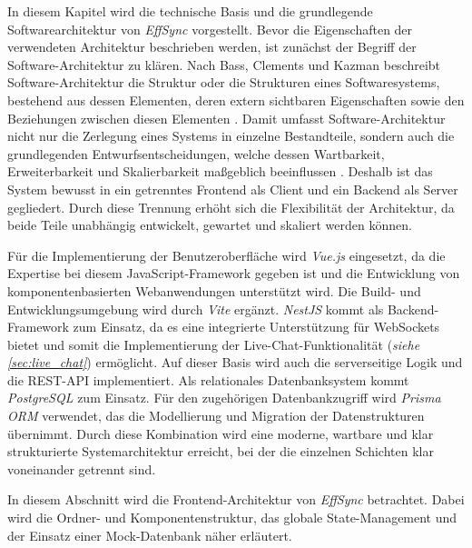 \label{ch:systemarchitektur}
In diesem Kapitel wird die technische Basis und die grundlegende Softwarearchitektur von \textit{EffSync} vorgestellt.
Bevor die Eigenschaften der verwendeten Architektur beschrieben werden, ist zunächst der Begriff der Software-Architektur zu klären. Nach Bass, Clements und Kazman beschreibt Software-Architektur die Struktur oder die Strukturen eines Softwaresystems, bestehend aus dessen Elementen, deren extern sichtbaren Eigenschaften sowie den Beziehungen zwischen diesen Elementen \cite{bass2012software}. Damit umfasst Software-Architektur nicht nur die Zerlegung eines Systems in einzelne Bestandteile, sondern auch die grundlegenden Entwurfsentscheidungen, welche dessen Wartbarkeit, Erweiterbarkeit und Skalierbarkeit maßgeblich beeinflussen \cite{bass2012software}.
Deshalb ist das System bewusst in ein getrenntes Frontend als Client und ein Backend als Server gegliedert. Durch diese Trennung erhöht sich die Flexibilität der Architektur, da beide Teile unabhängig entwickelt, gewartet und skaliert werden können.

\label{sec:technologie_stack}
Für die Implementierung der Benutzeroberfläche wird \textit{Vue.js} eingesetzt, da die Expertise bei diesem JavaScript-Framework gegeben ist und die Entwicklung von komponentenbasierten Webanwendungen\cite{vue_introduction} unterstützt wird. Die Build- und Entwicklungsumgebung wird durch \textit{Vite}\cite{vite_guide} ergänzt.
\textit{NestJS}\cite{nestjs_docs} kommt als Backend-Framework zum Einsatz, da es eine integrierte Unterstützung für WebSockets\cite{nestjs_websocket} bietet und somit die Implementierung der Live-Chat-Funktionalität (\textit{siehe \autoref{sec:live_chat}}) ermöglicht. Auf dieser Basis wird auch die serverseitige Logik und die \gls{REST-API} implementiert. 
Als relationales Datenbanksystem kommt \textit{PostgreSQL}\cite{postgresql} zum Einsatz. Für den zugehörigen Datenbankzugriff wird \textit{Prisma ORM}\cite{prisma_orm} verwendet, das die Modellierung und Migration der Datenstrukturen übernimmt.
Durch diese Kombination wird eine moderne, wartbare und klar strukturierte Systemarchitektur erreicht, bei der die einzelnen Schichten klar voneinander getrennt sind.

\label{sec:frontend_architektur}
In diesem Abschnitt wird die Frontend-Architektur von \textit{EffSync} betrachtet. Dabei wird die Ordner- und Komponentenstruktur, das globale State-Management und der Einsatz einer Mock-Datenbank näher erläutert.

